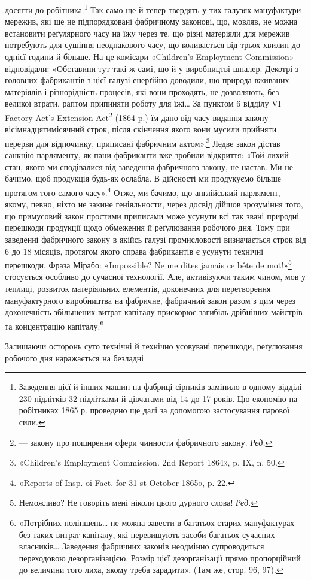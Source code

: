 \parcont{}  %
досягти до робітника.\footnote{
Заведення цієї й інших машин на фабриці сірників замінило в
одному відділі  230 підлітків 32 підлітками й дівчатами від 14 до 17 років.
Цю економію на робітниках 1865 р. проведено ще далі за допомогою застосування
парової сили.
} Так само ще й тепер твердять у тих
галузях мануфактури мережив, які ще не підпорядковані фабричному
законові, що, мовляв, не можна встановити реґулярного
часу на їжу через те, що різні матеріяли для мережив потребують
для сушіння неоднакового часу, що коливається від трьох хвилин
до однієї години й більше. На це комісари «Children’s Employment
Commission» відповідали: «Обставини тут такі ж самі, що
й у виробництві шпалер. Декотрі з головних фабрикантів з цієї
галузі енерґійно доводили, що природа вживаних матеріялів і
різнорідність процесів, які вони проходять, не дозволяють, без великої
втрати, раптом припиняти роботу для їжі\dots{} За пунктом 6
відділу VI Factory Act’s Extension Act\footnote*{
— закону про поширення сфери чинности фабричного закону. \emph{Ред.}
} (1864 p.) їм дано від
часу видання закону вісімнадцятимісячний строк, після скінчення
якого вони мусили прийняти перерви для відпочинку,
приписані фабричним актом».\footnote{
«Children’s Employment Commission. 2nd Report 1864», p. IX,
n. 50.
} Ледве закон дістав санкцію
парляменту, як пани фабриканти вже зробили відкриття: «Той
лихий стан, якого ми сподівалися від заведення фабричного закону,
не настав. Ми не бачимо, щоб продукція будь-як ослабла.
В дійсності ми продукуємо більше протягом того самого часу».\footnote{
«Reports of Insp. oî Fact. for 31 st October 1865», p. 22.
}
Отже, ми бачимо, що англійський парлямент, якому, певно,
ніхто не закине геніяльности, через досвід дійшов зрозуміння
того, що примусовий закон простими приписами може усунути
всі так звані природні перешкоди продукції щодо обмеження
й реґулювання робочого дня. Тому при заведенні фабричного
закону в якійсь галузі промисловості визначається строк від 6
до 18 місяців, протягом якого справа фабрикантів є усунути
технічні перешкоди. Фраза Мірабо: «Impossible? Ne me dites
jamais ce bête de mot!»\footnote*{
Неможливо? Не говоріть мені ніколи цього дурного слова! \emph{Ред.}
} стосується особливо до сучасної технології.
Але, активізуючи таким чином, мов у теплиці, розвиток
матеріяльних елементів, доконечних для перетворення мануфактурного
виробництва на фабричне, фабричний закон разом з
цим через доконечність збільшених витрат капіталу прискорює
загибіль дрібніших майстрів та концентрацію капіталу.\footnote{
«Потрібних поліпшень\dots{} не можна завести в багатьох старих
мануфактурах без таких витрат капіталу, які перевищують засоби багатьох
сучасних власників\dots{} Заведення фабричних законів неодмінно
супроводиться переходовою дезорганізацією. Розмір цієї дезорганізації
прямо пропорційний до величини того лиха, якому треба зарадити».
(Там же, стор. 96, 97).
}

Залишаючи осторонь суто технічні й технічно усовувані
перешкоди, реґулювання робочого дня наражається на безладні
\parbreak{}  %
